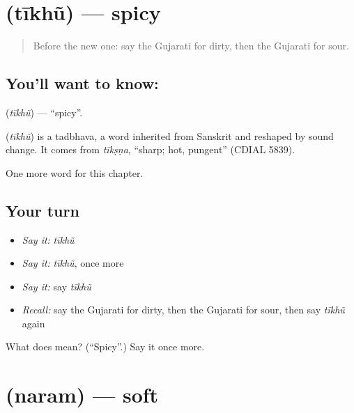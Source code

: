 \section[\texorpdfstring{\gu{તીખું} (tīkhũ)}{તીખું (tīkhũ)}]{ (tīkhũ) — spicy}

\label{lesson:GU-C132-tikhu}



\begin{quote}
Before the new one: say the Gujarati for dirty, then the Gujarati for sour.
\end{quote}

\subsection*{You'll want to know: }
\textbf{} (\emph{tīkhũ}) — \textquotedblleft{}spicy\textquotedblright{}.

\begin{cousinweb}
\textbf{} (\emph{tīkhũ}) is a tadbhava, a word inherited from Sanskrit and reshaped by sound change. It comes from \emph{tīkṣṇa}, \textquotedblleft{}sharp; hot, pungent\textquotedblright{} (CDIAL 5839).
\end{cousinweb}

\begin{grammarlens}[title={What you've built}]
One more word for this chapter.
\end{grammarlens}

\subsection*{Your turn}
\begin{itemize}
\raggedright
  \item \emph{Say it:} \emph{tīkhũ}
  \item \emph{Say it:} \emph{tīkhũ}, once more
  \item \emph{Say it:} say \emph{tīkhũ}
  \item \emph{Recall:} say the Gujarati for dirty, then the Gujarati for sour, then say \emph{tīkhũ} again
\end{itemize}

\begin{tcolorbox}[breakable,colback=teal!4,colframe=teal!35!black,title={Before you move on}]
What does  mean? (\textquotedblleft{}Spicy\textquotedblright{}.) Say it once more.
\end{tcolorbox}
\section[\texorpdfstring{\gu{નરમ} (naram)}{નરમ (naram)}]{ (naram) — soft}

